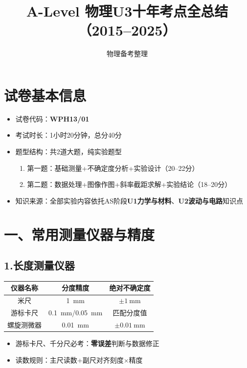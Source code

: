 \documentclass[a4paper,11pt]{article}
\title{A-Level 物理U3十年考点全总结（2015--2025）}
\author{物理备考整理}
\date{}
\begin{document}
\maketitle
\section{试卷基本信息}
\begin{itemize}
    \item 试卷代码：\textbf{WPH13/01}
    \item 考试时长：1小时20分钟，总分40分
    \item 题型结构：共2道大题，纯实验题型
    \begin{enumerate}
        \item 第一题：基础测量+不确定度分析+实验设计（20--22分）
        \item 第二题：数据处理+图像作图+斜率截距求解+实验结论（18--20分）
    \end{enumerate}
    \item 知识来源：全部实验内容依托AS阶段\textbf{U1力学与材料}、\textbf{U2波动与电路}知识点
\end{itemize}

\section{一、常用测量仪器与精度}
\subsection{1.长度测量仪器}
\begin{table}[h!]
\centering
\begin{tabular}{ccc}
\toprule
仪器名称 & 分度精度 & 绝对不确定度 \\
\midrule
米尺 & \SI{1}{\milli\metre} & $\pm\SI{1}{\milli\metre}$ \\
游标卡尺 & \SI{0.1}{\milli\metre}/\SI{0.05}{\milli\metre} & 匹配分度值 \\
螺旋测微器 & \SI{0.01}{\milli\metre} & $\pm\SI{0.01}{\milli\metre}$ \\
\bottomrule
\end{tabular}
\end{table}
\begin{itemize}
    \item 游标卡尺、千分尺必考：\textbf{零误差}判断与数据修正
    \item 读数规则：主尺读数+副尺对齐刻度$\times$精度
\end{itemize}
\end{document}

